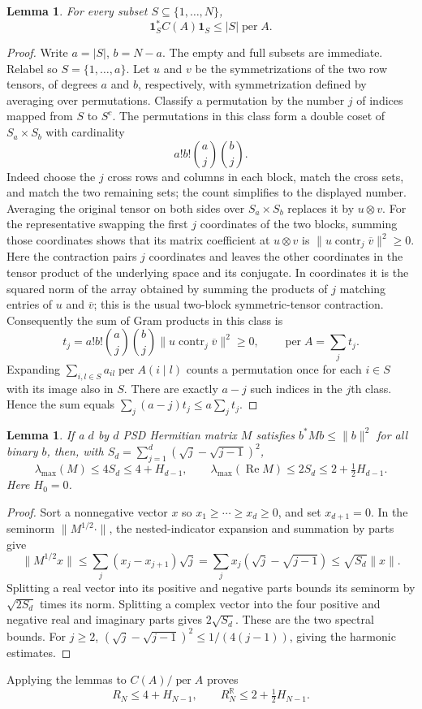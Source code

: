 \documentclass[11pt]{article}
\newtheorem{lemma}[theorem]{Lemma}
\DeclareMathOperator{\per}{per}
\DeclareMathOperator{\Ree}{Re}
\newcommand{\contr}{\operatorname{contr}}
\newcommand{\one}{\mathbf 1}
\begin{document}
\begin{lemma}\label{lem:indicator}
For every subset $S\subseteq\{1,\ldots,N\}$,
\[
 \one_S^*C(A)\one_S\le |S|\per A.
\]
\end{lemma}
\begin{proof}
Write $a=|S|$, $b=N-a$. The empty and full subsets are immediate. Relabel so
$S=\{1,\ldots,a\}$. Let $u$ and $v$ be the symmetrizations of the two row
tensors, of degrees $a$ and $b$, respectively, with symmetrization defined by
averaging over permutations. Classify a permutation by the number $j$ of
indices mapped from $S$ to $S^c$. The permutations in this class form a double
coset of $S_a\times S_b$ with cardinality
\[
 a!b!\binom aj\binom bj.
\]
Indeed choose the $j$ cross rows and columns in each block, match the cross
sets, and match the two remaining sets; the count simplifies to the displayed
number. Averaging the original tensor on both sides over $S_a\times S_b$
replaces it by $u\otimes v$. For the representative swapping the first $j$
coordinates of the two blocks, summing those coordinates shows that its
matrix coefficient at $u\otimes v$ is
$\|u\mathbin{\contr_j}\overline v\|^2\ge0$. Here the contraction pairs $j$
coordinates and leaves the other coordinates in the tensor product of the
underlying space and its conjugate. In coordinates it is the squared norm
of the array obtained by summing the products of $j$ matching entries of $u$
and $\overline v$; this is the usual two-block symmetric-tensor contraction.
Consequently the sum of Gram products in this class is
\[
 t_j=a!b!\binom aj\binom bj
       \|u\mathbin{\contr_j}\overline v\|^2\ge0,
 \qquad \per A=\sum_jt_j.
\]
Expanding $\sum_{i,l\in S}a_{il}\per A(i\mid l)$ counts a permutation once
for each $i\in S$ with its image also in $S$. There are exactly $a-j$ such
indices in the $j$th class. Hence the sum equals
$\sum_j(a-j)t_j\le a\sum_jt_j$.
\end{proof}

\begin{lemma}\label{lem:layer}
If a $d$ by $d$ PSD Hermitian matrix $M$ satisfies
$b^*Mb\le\|b\|^2$ for all binary $b$, then, with
$S_d=\sum_{j=1}^d(\sqrt j-\sqrt{j-1})^2$,
\[
 \lambda_{\max}(M)\le4S_d\le4+H_{d-1},\qquad
 \lambda_{\max}(\Ree M)\le2S_d\le2+\tfrac12H_{d-1}.
\]
Here $H_0=0$.
\end{lemma}
\begin{proof}
Sort a nonnegative vector $x$ so $x_1\ge\cdots\ge x_d\ge0$, and set
$x_{d+1}=0$. In the seminorm $\|M^{1/2}\cdot\|$, the nested-indicator
expansion and summation by parts give
\[
 \|M^{1/2}x\|
 \le\sum_j(x_j-x_{j+1})\sqrt j
 =\sum_jx_j(\sqrt j-\sqrt{j-1})
 \le\sqrt{S_d}\|x\|.
\]
Splitting a real vector into its positive and negative parts bounds its
seminorm by $\sqrt{2S_d}$ times its norm. Splitting a complex vector into the
four positive and negative real and imaginary parts gives $2\sqrt{S_d}$.
These are the two spectral bounds. For $j\ge2$,
$(\sqrt j-\sqrt{j-1})^2\le1/(4(j-1))$, giving the harmonic estimates.
\end{proof}
Applying the lemmas to $C(A)/\per A$ proves
\begin{equation}\label{eq:upper}
 R_N\le4+H_{N-1},\qquad R_N^{\mathbb R}\le2+\tfrac12H_{N-1}.
\end{equation}
\end{document}
